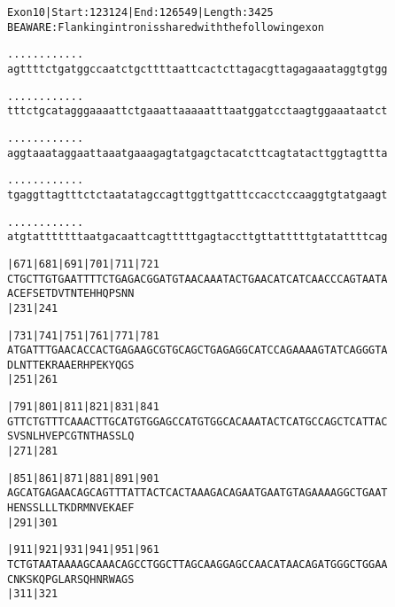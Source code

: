 \documentclass{article}
\begin{document}
\begin{alltt}
Exon 10 | Start: 123124 | End: 126549 | Length: 3425
BE AWARE: Flanking intron is shared with the following exon

.    .    .    .    .    .    .    .    .    .    .    .    
agttttctgatggccaatctgcttttaattcactcttagacgttagagaaataggtgtgg

.    .    .    .    .    .    .    .    .    .    .    .    
tttctgcatagggaaaattctgaaattaaaaatttaatggatcctaagtggaaataatct

.    .    .    .    .    .    .    .    .    .    .    .    
aggtaaataggaattaaatgaaagagtatgagctacatcttcagtatacttggtagttta

.    .    .    .    .    .    .    .    .    .    .    .    
tgaggttagtttctctaatatagccagttggttgatttccacctccaaggtgtatgaagt

.    .    .    .    .    .    .    .    .    .    .    .    
atgtatttttttaatgacaattcagtttttgagtaccttgttatttttgtatattttcag

|671      |681      |691      |701      |711      |721      
CTGCTTGTGAATTTTCTGAGACGGATGTAACAAATACTGAACATCATCAACCCAGTAATA
  A  C  E  F  S  E  T  D  V  T  N  T  E  H  H  Q  P  S  N  N
                    |231                          |241      

|731      |741      |751      |761      |771      |781      
ATGATTTGAACACCACTGAGAAGCGTGCAGCTGAGAGGCATCCAGAAAAGTATCAGGGTA
  D  L  N  T  T  E  K  R  A  A  E  R  H  P  E  K  Y  Q  G  S
                    |251                          |261      

|791      |801      |811      |821      |831      |841      
GTTCTGTTTCAAACTTGCATGTGGAGCCATGTGGCACAAATACTCATGCCAGCTCATTAC
  S  V  S  N  L  H  V  E  P  C  G  T  N  T  H  A  S  S  L  Q
                    |271                          |281      

|851      |861      |871      |881      |891      |901      
AGCATGAGAACAGCAGTTTATTACTCACTAAAGACAGAATGAATGTAGAAAAGGCTGAAT
  H  E  N  S  S  L  L  L  T  K  D  R  M  N  V  E  K  A  E  F
                    |291                          |301      

|911      |921      |931      |941      |951      |961      
TCTGTAATAAAAGCAAACAGCCTGGCTTAGCAAGGAGCCAACATAACAGATGGGCTGGAA
  C  N  K  S  K  Q  P  G  L  A  R  S  Q  H  N  R  W  A  G  S
                    |311                          |321      

\end{alltt}
\newpage
\end{document}

